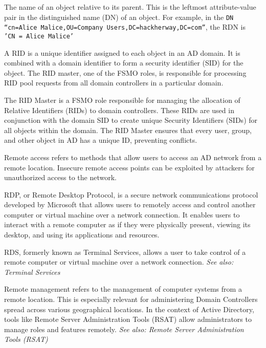  The name of an object relative to its parent. This is the leftmost attribute-value pair in the distinguished name (DN) of an object. For example, in the \texttt{DN “cn=Alice Malice,OU=Company Users,DC=hackherway,DC=com”}, the RDN is \texttt{ 'CN = Alice Malice'}

 A RID is a unique identifier assigned to each object in an AD domain. It is combined with a domain identifier to form a security identifier (SID) for the object. The RID master, one of the FSMO roles, is responsible for processing RID pool requests from all domain controllers in a particular domain.

 The RID Master is a FSMO role responsible for managing the allocation of Relative Identifiers (RIDs) to domain controllers. These RIDs are used in conjunction with the domain SID to create unique Security Identifiers (SIDs) for all objects within the domain. The RID Master ensures that every user, group, and other object in AD has a unique ID, preventing conflicts.

 Remote access refers to methods that allow users to access an AD network from a remote location. Insecure remote access points can be exploited by attackers for unauthorized access to the network.

 RDP, or Remote Desktop Protocol, is a secure network communications protocol developed by Microsoft that allows users to remotely access and control another computer or virtual machine over a network connection. It enables users to interact with a remote computer as if they were physically present, viewing its desktop, and using its applications and resources.

 RDS, formerly known as Terminal Services, allows a user to take control of a remote computer or virtual machine over a network connection.
\textit{See also: Terminal Services}

 Remote management refers to the management of computer systems from a remote location. This is especially relevant for administering Domain Controllers spread across various geographical locations. In the context of Active Directory, tools like Remote Server Administration Tools (RSAT) allow administrators to manage roles and features remotely.
\textit{See also: Remote Server Administration Tools (RSAT)}

